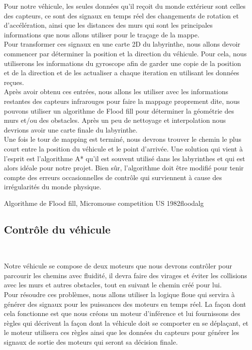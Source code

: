    Pour notre véhicule, les seules données qu'il reçoit du monde extérieur sont
celles des capteurs, ce sont des signaux en temps réel des changements de
rotation et d'accélération, ainsi que les distances des murs qui sont les
principales informations que nous allons utiliser pour le traçage de la mappe. \\

   Pour transformer ces signaux en une carte 2D du labyrinthe, nous allons devoir
commencer par déterminer la position et la direction du véhicule. Pour cela,
nous utiliserons les informations du gyroscope afin de garder une copie de la
position et de la direction et de les actualiser a chaque iteration en
utilisant les données reçues. \\

   Après avoir obtenu ces entrées, nous allons les utiliser avec les informations
restantes des capteurs infrarouges pour faire la mappage proprement dite, nous
pouvons utiliser un algorithme de Flood fill pour déterminer la géométrie des
murs et/ou des obstacles. Après un peu de nettoyage et interpolation nous
devrions avoir une carte finale du labyrinthe. \\

   Une fois le tour de mapping est terminé, nous devrons trouver le chemin le plus
court entre la position du véhicule et le point d'arrivée. Une solution qui
vient à l'esprit est l'algorithme A* qu'il est souvent utilisé dans les
labyrinthes et qui est alors idéale pour notre projet. Bien sûr, l'algorithme
doit être modifié pour tenir compte des erreurs occasionnelles de contrôle qui
surviennent à cause des irrégularités du monde physique.

{Algorithme de Flood fill, Micromouse competition US 1982}{floodalg}

\subsection{Contrôle du véhicule} \label{sec:ctrlComm}

Notre véhicule se compose de deux moteurs que nous devrons contrôler pour
parcourir les chemins avec fluidité, il devra faire des virages et éviter les
collisions avec les murs et autres obstacles, tout en suivant le chemin créé
pour lui. \\

Pour résoudre ces problèmes, nous allons utiliser la logique floue qui servira
à générer des signaux pour les puissances des moteurs en temps réel. La façon
dont cela fonctionne est que nous créons un moteur d'inférence et lui
fournissons des règles qui décrivent la façon dont la véhicule doit se comporter 
en se déplaçant, et le moteur utilisera ces règles ainsi que les données du
capteurs pour générer les signaux de sortie des moteurs qui seront sa décision
finale.

